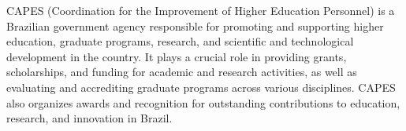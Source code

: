 \documentclass[10pt,a4paper,ragged2e,withhyper,academicons]{altacv}
\begin{document}
\begin{paracol}{1}




















CAPES (Coordination for the Improvement of Higher Education Personnel) is a Brazilian government agency responsible for promoting and supporting higher education, graduate programs, research, and scientific and technological development in the country. It plays a crucial role in providing grants, scholarships, and funding for academic and research activities, as well as evaluating and accrediting graduate programs across various disciplines. CAPES also organizes awards and recognition for outstanding contributions to education, research, and innovation in Brazil.


\end{paracol}
\end{document}
